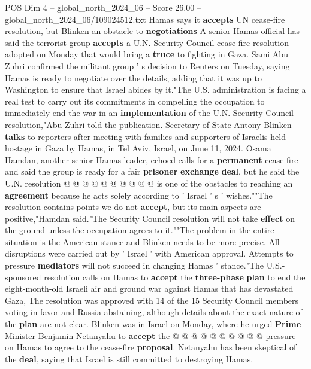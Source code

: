 \begin{textsample}{POS Dim 4 – global\_north\_2024\_06 – Score 26.00 – global\_north\_2024\_06/109024512.txt}  \label{ex:f4_pos_143}
Hamas says it \textbf{accepts} UN cease-fire resolution, but Blinken an obstacle to \textbf{negotiations} A senior Hamas official has said the terrorist group \textbf{accepts} a U.N.
Security Council cease-fire resolution adopted on Monday that would bring a \textbf{truce} to fighting in Gaza.
Sami Abu Zuhri confirmed the militant group ' s decision to Reuters on Tuesday, saying Hamas is ready to negotiate over the details, adding that it was up to Washington to ensure that Israel abides by it."The U.S. administration is facing a real test to carry out its commitments in compelling the occupation to immediately end the war in an \textbf{implementation} of the U.N.
Security Council resolution,"Abu Zuhri told the publication.
Secretary of State Antony Blinken \textbf{talks} to reporters after meeting with families and supporters of Israelis held hostage in Gaza by Hamas, in Tel Aviv, Israel, on June 11, 2024.
Osama Hamdan, another senior Hamas leader, echoed calls for a \textbf{permanent} cease-fire and said the group is ready for a fair \textbf{prisoner} \textbf{exchange} \textbf{deal}, but he said the U.N. resolution @ @ @ @ @ @ @ @ @ @ is one of the obstacles to reaching an \textbf{agreement} because he acts solely according to ' Israel ' s ' wishes.""The resolution contains points we do not \textbf{accept}, but its main aspects are positive,"Hamdan said."The Security Council resolution will not take \textbf{effect} on the ground unless the occupation agrees to it.""The problem in the entire situation is the American stance and Blinken needs to be more precise.
All disruptions were carried out by ' Israel ' with American approval.
Attempts to pressure \textbf{mediators} will not succeed in changing Hamas ' stance."The U.S.-sponsored resolution calls on Hamas to \textbf{accept} the \textbf{three-phase} \textbf{plan} to end the eight-month-old Israeli air and ground war against Hamas that has devastated Gaza, The resolution was approved with 14 of the 15 Security Council members voting in favor and Russia abstaining, although details about the exact nature of the \textbf{plan} are not clear.
Blinken was in Israel on Monday, where he urged \textbf{Prime} Minister Benjamin Netanyahu to \textbf{accept} the @ @ @ @ @ @ @ @ @ @ pressure on Hamas to agree to the cease-fire \textbf{proposal}.
Netanyahu has been skeptical of the \textbf{deal}, saying that Israel is still committed to destroying Hamas.

\end{textsample}

